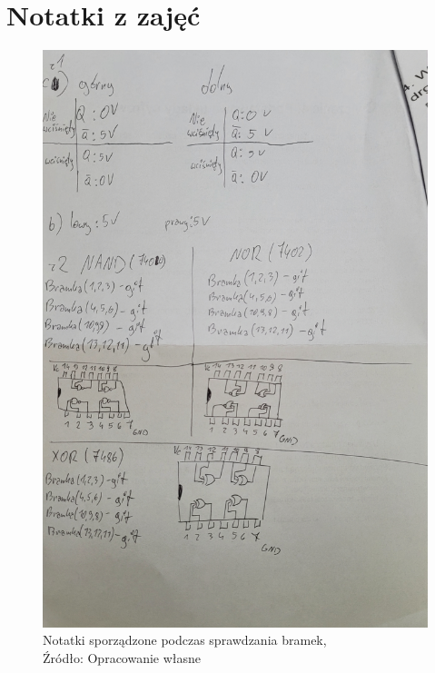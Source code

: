 \documentclass{article}
\begin{document}
  \section{Notatki z zajęć}

  \begin{figure}[!ht]
    \begin{minipage}{.5\textwidth}
      \centering
      \includegraphics[scale=0.07]{grafiki/notatki1.jpg}
      \caption{Notatki sporządzone podczas sprawdzania bramek,
      \\Źródło: Opracowanie własne}
    \end{minipage}
    \begin{minipage}{.5\textwidth}
      \centering

\end{minipage}
\end{figure}
\end{document}
